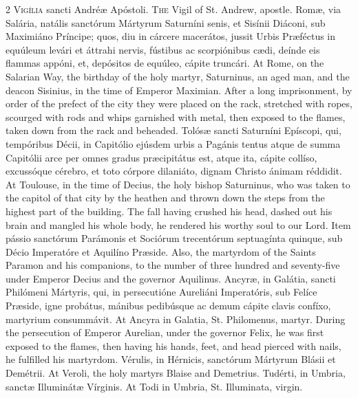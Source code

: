 \begin{paracol}{2}
\lettrine[lines=1]{V}{igília} sancti Andréæ 
 Apóstoli.
\switchcolumn
{}
\lettrine[lines=1]{T}{he} Vigil of St. Andrew, apostle.
\switchcolumn*
{}
Romæ, via Salária, 
 natális sanctórum Mártyrum Saturníni senis, et Sisínii Diáconi, sub 
 Maximiáno Príncipe; quos, diu in cárcere macerátos, jussit Urbis Præféctus 
 in equúleum levári et áttrahi nervis, fústibus ac scorpiónibus cædi, deínde 
 eis flammas appóni, et, depósitos de equúleo, cápite truncári.
\switchcolumn
{}
At Rome, on the Salarian Way, the 
 birthday of the holy martyr, Saturninus, an aged man, and the deacon 
 Sisinius, in the time of Emperor Maximian. After a long imprisonment, 
 by order of the prefect of the city they were placed on the rack, stretched 
 with ropes, scourged with rods and whips garnished with metal, then exposed 
 to the flames, taken down from the rack and beheaded.
\switchcolumn*
{}
Tolósæ sancti Saturníni 
 Epíscopi, qui, tempóribus Décii, in Capitólio ejúsdem urbis a Pagánis tentus 
 atque de summa Capitólii arce per omnes gradus præcipitátus est, atque ita, 
 cápite collíso, excussóque cérebro, et toto córpore dilaniáto, dignam 
 Christo ánimam réddidit.
\switchcolumn
{}
At Toulouse, in the time of Decius, 
 the holy bishop Saturninus, who was taken to the capitol of that city by the 
 heathen and thrown down the steps from the highest part of the building. 
 The fall having crushed his head, dashed out his brain and mangled his whole 
 body, he rendered his worthy soul to our Lord.
\switchcolumn*
{}
Item pássio sanctórum 
 Parámonis et Sociórum trecentórum septuagínta quinque, sub Décio Imperatóre 
 et Aquilíno Præside.
\switchcolumn
{}
Also, the martyrdom of the Saints 
 Paramon and his companions, to the number of three hundred and seventy-five 
 under Emperor Decius and the governor Aquilinus.
\switchcolumn*
{}
Ancyræ, in Galátia, sancti Philómeni Mártyris, qui, in persecutióne Aureliáni Imperatóris, sub 
 Felíce Præside, igne probátus, mánibus pedibúsque ac demum cápite clavis 
 confíxo, martyrium consummávit.
\switchcolumn
{}
At Ancyra in Galatia, St. Philomenus, 
 martyr. During the persecution of Emperor Aurelian, under the governor 
 Felix, he was first exposed to the flames, then having his hands, feet, and 
 head pierced with nails, he fulfilled his martyrdom.
\switchcolumn*
{}
Vérulis, in Hérnicis, 
 sanctórum Mártyrum Blásii et Demétrii.
\switchcolumn
{}
At Veroli, the holy martyrs Blaise 
 and Demetrius.
\switchcolumn*
{}
Tudérti, in Umbria, 
 sanctæ Illuminátæ Vírginis.
\switchcolumn
{}
At Todi in Umbria, St. Illuminata, 
 virgin.
\switchcolumn*
{}
\end{paracol}


